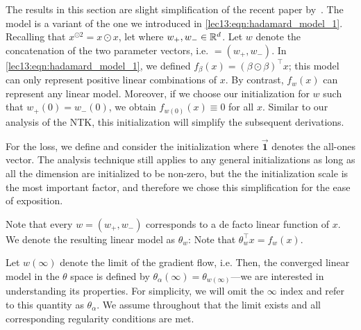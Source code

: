 The results in this section are slight simplification of the recent paper by~\citet{woodworth2020kernel}. The model is a variant of the one we introduced in \eqref{lec13:eqn:hadamard_model_1}. Recalling that $x^{\odot 2} = x \odot x$, let
where $w_+, w_- \in \mathbb R^d$. Let $w$ denote the concatenation of the two parameter vectors, i.e. $= (w_+, w_-)$.  In \eqref{lec13:eqn:hadamard_model_1}, we defined $f_\beta(x) = (\beta \odot \beta)^\top x$; this model can only represent positive linear combinations of $x$.  By contrast, $f_w(x)$ can represent any linear model. Moreover, if we choose our initialization for $w$ such that $w_+(0) = w_-(0)$, we obtain $f_{w(0)}(x) \equiv 0$ for all $x$. Similar to our analysis of the NTK, this initialization will simplify the subsequent derivations.

For the loss, we define
and consider the initialization
where $\vec{\mathbf{1}}$ denotes the all-ones vector. The analysis technique still applies to any general initializations as long as all the dimension are initialized to be non-zero, but the the initialization scale is the most important factor, and therefore we chose this simplification for the ease of exposition. 

Note that every $w = (w_+, w_{-})$ corresponds to a de facto linear function of $x$. We denote the resulting linear model as $\theta_w$:
Note that $\theta_w^\top x = f_w(x)$. 

Let $w(\infty)$ denote the limit of the gradient flow, i.e.
Then, the converged linear model in the $\theta$ space is defined by $\theta_\alpha(\infty) = \theta_{w(\infty)}$---we are interested in understanding its properties.  For simplicity, we will omit the $\infty$ index and refer to this quantity as $\theta_\alpha$. We assume throughout that the limit exists and all corresponding regularity conditions are met.

